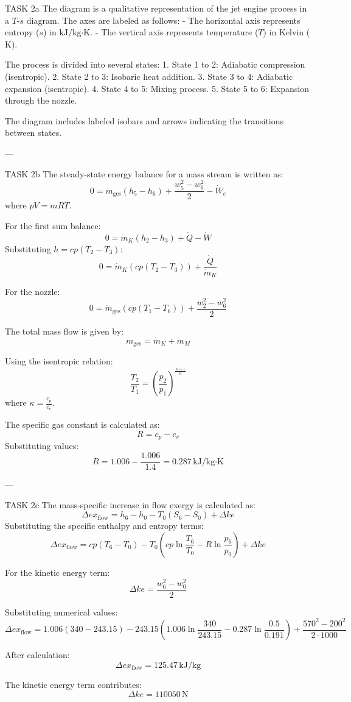 TASK 2a  
The diagram is a qualitative representation of the jet engine process in a \( T \)-\( s \) diagram. The axes are labeled as follows:  
- The horizontal axis represents entropy (\( s \)) in \( \text{kJ}/\text{kg·K} \).  
- The vertical axis represents temperature (\( T \)) in Kelvin (\( \text{K} \)).  

The process is divided into several states:  
1. State 1 to 2: Adiabatic compression (isentropic).  
2. State 2 to 3: Isobaric heat addition.  
3. State 3 to 4: Adiabatic expansion (isentropic).  
4. State 4 to 5: Mixing process.  
5. State 5 to 6: Expansion through the nozzle.  

The diagram includes labeled isobars and arrows indicating the transitions between states.  

---

TASK 2b  
The steady-state energy balance for a mass stream is written as:  
\[
0 = \dot{m}_{\text{ges}} \left( h_5 - h_6 \right) + \frac{w_5^2 - w_6^2}{2} - \dot{W}_e
\]  
where \( pV = mRT \).  

For the first sum balance:  
\[
0 = \dot{m}_K \left( h_2 - h_3 \right) + \dot{Q} - \dot{W}
\]  
Substituting \( h = cp(T_2 - T_3) \):  
\[
0 = \dot{m}_K \left( cp(T_2 - T_3) \right) + \frac{\dot{Q}}{\dot{m}_K}
\]  

For the nozzle:  
\[
0 = \dot{m}_{\text{ges}} \left( cp(T_1 - T_6) \right) + \frac{w_2^2 - w_6^2}{2}
\]  

The total mass flow is given by:  
\[
\dot{m}_{\text{ges}} = \dot{m}_K + \dot{m}_M
\]  

Using the isentropic relation:  
\[
\frac{T_2}{T_1} = \left( \frac{p_2}{p_1} \right)^{\frac{\kappa - 1}{\kappa}}
\]  
where \( \kappa = \frac{c_p}{c_v} \).  

The specific gas constant is calculated as:  
\[
R = c_p - c_v
\]  
Substituting values:  
\[
R = 1.006 - \frac{1.006}{1.4} = 0.287 \, \text{kJ/kg·K}
\]  

---

TASK 2c  
The mass-specific increase in flow exergy is calculated as:  
\[
\Delta ex_{\text{flow}} = h_6 - h_0 - T_0(S_6 - S_0) + \Delta ke
\]  
Substituting the specific enthalpy and entropy terms:  
\[
\Delta ex_{\text{flow}} = cp(T_6 - T_0) - T_0 \left( cp \ln \frac{T_6}{T_0} - R \ln \frac{p_6}{p_0} \right) + \Delta ke
\]  

For the kinetic energy term:  
\[
\Delta ke = \frac{w_6^2 - w_0^2}{2}
\]  

Substituting numerical values:  
\[
\Delta ex_{\text{flow}} = 1.006(340 - 243.15) - 243.15 \left( 1.006 \ln \frac{340}{243.15} - 0.287 \ln \frac{0.5}{0.191} \right) + \frac{570^2 - 200^2}{2 \cdot 1000}
\]  

After calculation:  
\[
\Delta ex_{\text{flow}} = 125.47 \, \text{kJ/kg}
\]  

The kinetic energy term contributes:  
\[
\Delta ke = 110050 \, \text{N}
\]